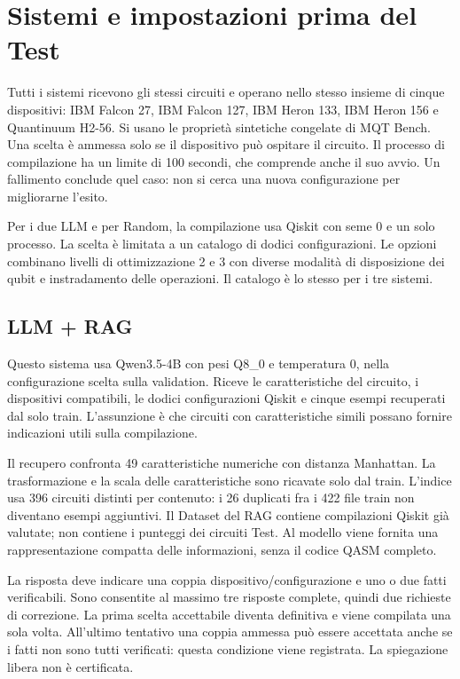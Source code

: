 \section{Sistemi e impostazioni prima del Test}
Tutti i sistemi ricevono gli stessi circuiti e operano nello stesso insieme
di cinque dispositivi: IBM Falcon 27, IBM Falcon 127, IBM Heron 133,
IBM Heron 156 e Quantinuum H2-56. Si usano le proprietà sintetiche congelate
di MQT Bench. Una scelta è ammessa solo se il dispositivo può ospitare
il circuito. Il processo di compilazione ha un limite di 100 secondi,
che comprende anche il suo avvio. Un fallimento conclude quel caso:
non si cerca una nuova configurazione per migliorarne l'esito.

Per i due LLM e per Random, la compilazione usa Qiskit con seme 0 e un solo
processo. La scelta è limitata a un catalogo di dodici configurazioni.
Le opzioni combinano livelli di ottimizzazione 2 e 3 con diverse modalità
di disposizione dei qubit e instradamento delle operazioni.
Il catalogo è lo stesso per i tre sistemi.

\subsection{LLM + RAG}
Questo sistema usa Qwen3.5-4B con pesi Q8\_0 e temperatura 0, nella
configurazione scelta sulla validation. Riceve le caratteristiche del circuito,
i dispositivi compatibili, le dodici configurazioni Qiskit e cinque esempi
recuperati dal solo train. L'assunzione è che circuiti con caratteristiche
simili possano fornire indicazioni utili sulla compilazione.

Il recupero confronta 49 caratteristiche numeriche con distanza Manhattan.
La trasformazione e la scala delle caratteristiche sono ricavate solo dal
train. L'indice usa 396 circuiti distinti per contenuto: i 26 duplicati
fra i 422 file train non diventano esempi aggiuntivi.
Il Dataset del RAG contiene compilazioni Qiskit già valutate; non contiene
i punteggi dei circuiti Test. Al modello viene fornita una rappresentazione
compatta delle informazioni, senza il codice QASM completo.

La risposta deve indicare una coppia dispositivo/configurazione e uno o due
fatti verificabili. Sono consentite al massimo tre risposte complete,
quindi due richieste di correzione. La prima scelta accettabile diventa
definitiva e viene compilata una sola volta. All'ultimo tentativo una coppia
ammessa può essere accettata anche se i fatti non sono tutti verificati:
questa condizione viene registrata. La spiegazione libera non è certificata.

